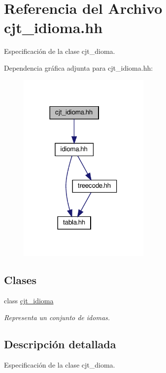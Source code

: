 \hypertarget{cjt__idioma_8hh}{}\section{Referencia del Archivo cjt\+\_\+idioma.\+hh}
\label{cjt__idioma_8hh}


Especificación de la clase cjt\+\_\+dioma.  


Dependencia gráfica adjunta para cjt\+\_\+idioma.\+hh\+:\nopagebreak
\begin{figure}[H]
\begin{center}
\leavevmode
\includegraphics[width=182pt]{cjt__idioma_8hh__incl}
\end{center}
\end{figure}
\subsection*{Clases}
\begin{DoxyCompactItemize}
\item 
class \hyperlink{classcjt__idioma}{cjt\+\_\+idioma}
\begin{DoxyCompactList}\small\item\em Representa un conjunto de idomas. \end{DoxyCompactList}\end{DoxyCompactItemize}


\subsection{Descripción detallada}
Especificación de la clase cjt\+\_\+dioma. 

